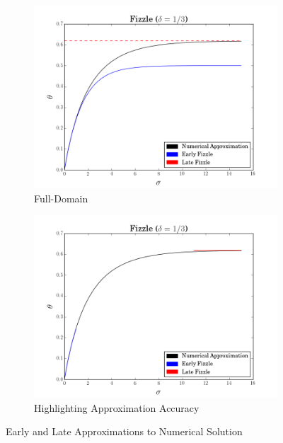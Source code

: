 \documentclass{article}
\begin{document}
\begin{figure}[H]
\begin{center}
\begin{subfigure}{.5\textwidth}
  \centering
  \includegraphics[scale = .4]{fizzle}
  \caption{Full-Domain}
\end{subfigure}%
\begin{subfigure}{.5\textwidth}
  \centering
  \includegraphics[scale = .4]{fizzleapprox}
  \caption{Highlighting Approximation Accuracy}
\end{subfigure}
\caption{Early and Late Approximations to Numerical Solution}
\label{fig:test}
\end{center}
\end{figure}
\end{document}
